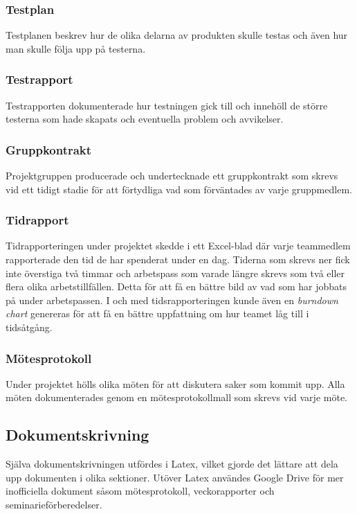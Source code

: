\subsubsection*{Testplan}
Testplanen beskrev hur de olika delarna av produkten skulle testas och även hur man skulle följa upp på testerna.

\subsubsection*{Testrapport}
Testrapporten dokumenterade hur testningen gick till och innehöll de större testerna som hade skapats och eventuella problem och avvikelser.

\subsubsection*{Gruppkontrakt}
Projektgruppen producerade och undertecknade ett gruppkontrakt som skrevs vid ett tidigt stadie för att förtydliga vad som förväntades av varje gruppmedlem.

\subsubsection*{Tidrapport}
Tidrapporteringen under projektet skedde i ett Excel-blad där varje teammedlem rapporterade den tid de har spenderat under en dag. Tiderna som skrevs ner fick inte överstiga två timmar och arbetspass som varade längre skrevs som två eller flera olika arbetstillfällen. Detta för att få en bättre bild av vad som har jobbats på under arbetspassen. I och med tidsrapporteringen kunde även en \textit{burndown chart} genereras för att få en bättre uppfattning om hur teamet låg till i tidsåtgång.

\subsubsection*{Mötesprotokoll}
Under projektet hölls olika möten för att diskutera saker som kommit upp. Alla möten dokumenterades genom en mötesprotokollmall som skrevs vid varje möte.

\subsection{Dokumentskrivning}
Själva dokumentskrivningen utfördes i Latex, vilket gjorde det lättare att dela upp dokumenten i olika sektioner. Utöver Latex användes Google Drive för mer inofficiella dokument såsom mötesprotokoll, veckorapporter och seminarieförberedelser.

